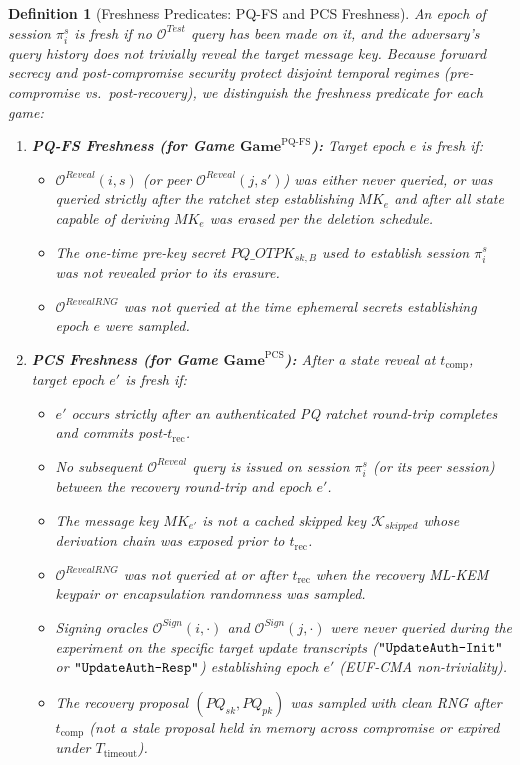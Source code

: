 \documentclass[11pt,a4paper]{article}
\newtheorem{definition}[theorem]{Definition}
\theoremstyle{remark}
\theoremstyle{plain}
\newcommand{\PGame}{\mathbf{Game}}
\newcommand{\calO}{\mathcal{O}}
\newcommand{\strlit}[1]{\text{\upshape\texttt{"#1"}}}
\begin{document}
\begin{definition}[Freshness Predicates: PQ-FS and PCS Freshness]
\label{def:fresh}
An epoch of session $\pi^s_i$ is fresh if no $\calO^{Test}$ query has been made on it, and the adversary's query history does not trivially reveal the target message key.  Because forward secrecy and post-compromise security protect disjoint temporal regimes (pre-compromise vs.\ post-recovery), we distinguish the freshness predicate for each game:
\begin{enumerate}
  \item \textbf{PQ-FS Freshness (for Game $\PGame^{\mathrm{PQ\text{-}FS}}$):} Target epoch $e$ is fresh if:
    \begin{itemize}
      \item $\calO^{Reveal}(i, s)$ (or peer $\calO^{Reveal}(j, s')$) was either never queried, or was queried strictly after the ratchet step establishing $MK_e$ and after all state capable of deriving $MK_e$ was erased per the deletion schedule.
      \item The one-time pre-key secret $PQ\_OTPK_{sk,B}$ used to establish session $\pi^s_i$ was not revealed prior to its erasure.
      \item $\calO^{RevealRNG}$ was not queried at the time ephemeral secrets establishing epoch $e$ were sampled.
    \end{itemize}
  \item \textbf{PCS Freshness (for Game $\PGame^{\mathrm{PCS}}$):} After a state reveal at $t_{\mathrm{comp}}$, target epoch $e'$ is fresh if:
    \begin{itemize}
      \item $e'$ occurs strictly after an authenticated PQ ratchet round-trip completes and commits post-$t_{\mathrm{rec}}$.
      \item No subsequent $\calO^{Reveal}$ query is issued on session $\pi^s_i$ (or its peer session) between the recovery round-trip and epoch $e'$.
      \item The message key $MK_{e'}$ is not a cached skipped key $\mathcal{K}_{skipped}$ whose derivation chain was exposed prior to $t_{\mathrm{rec}}$.
      \item $\calO^{RevealRNG}$ was not queried at or after $t_{\mathrm{rec}}$ when the recovery ML-KEM keypair or encapsulation randomness was sampled.
      \item Signing oracles $\calO^{Sign}(i, \cdot)$ and $\calO^{Sign}(j, \cdot)$ were never queried
        during the experiment on the specific target update transcripts
        ($\strlit{UpdateAuth-Init}$ or $\strlit{UpdateAuth-Resp}$) establishing epoch $e'$ (EUF-CMA non-triviality).
      \item The recovery proposal $(PQ_{sk}, PQ_{pk})$ was sampled with clean RNG after $t_{\mathrm{comp}}$ (not a stale proposal held in memory across compromise or expired under $T_{\mathrm{timeout}}$).
    \end{itemize}
\end{enumerate}
\end{definition}
\end{document}
